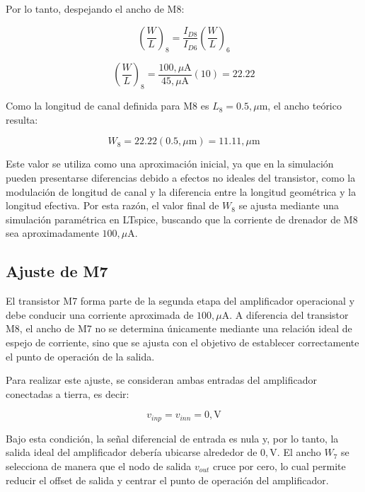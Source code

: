 \documentclass[journal]{IEEEtran}
\begin{document}
Por lo tanto, despejando el ancho de M8:

\begin{equation}
\left(\frac{W}{L}\right)_8 =
\frac{I_{D8}}{I_{D6}}
\left(\frac{W}{L}\right)_6
\end{equation}

\begin{equation}
\left(\frac{W}{L}\right)_8 =
\frac{100,\mu\text{A}}{45,\mu\text{A}}(10)
=22.22
\end{equation}

Como la longitud de canal definida para M8 es $L_8=0.5,\mu\text{m}$, el ancho teórico resulta:

\begin{equation}
W_8 = 22.22(0.5,\mu\text{m})
=11.11,\mu\text{m}
\end{equation}

Este valor se utiliza como una aproximación inicial, ya que en la simulación pueden presentarse diferencias debido a efectos no ideales del transistor, como la modulación de longitud de canal y la diferencia entre la longitud geométrica y la longitud efectiva. Por esta razón, el valor final de $W_8$ se ajusta mediante una simulación paramétrica en LTspice, buscando que la corriente de drenador de M8 sea aproximadamente $100,\mu\text{A}$.

\subsection{Ajuste de M7}

El transistor M7 forma parte de la segunda etapa del amplificador operacional y debe conducir una corriente aproximada de $100,\mu\text{A}$. A diferencia del transistor M8, el ancho de M7 no se determina únicamente mediante una relación ideal de espejo de corriente, sino que se ajusta con el objetivo de establecer correctamente el punto de operación de la salida.

Para realizar este ajuste, se consideran ambas entradas del amplificador conectadas a tierra, es decir:

\begin{equation}
v_{inp}=v_{inn}=0,\text{V}
\end{equation}

Bajo esta condición, la señal diferencial de entrada es nula y, por lo tanto, la salida ideal del amplificador debería ubicarse alrededor de $0,\text{V}$. El ancho $W_7$ se selecciona de manera que el nodo de salida $v_{out}$ cruce por cero, lo cual permite reducir el offset de salida y centrar el punto de operación del amplificador.
\end{document}
